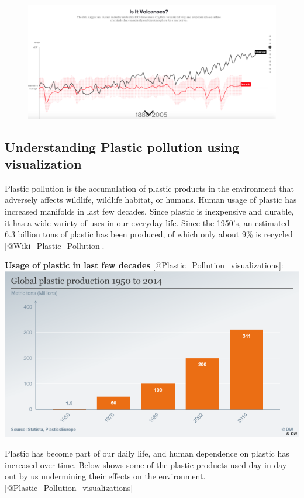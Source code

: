 \documentclass[]{book}
\theoremstyle{definition}
\theoremstyle{definition}
\theoremstyle{definition}
\theoremstyle{remark}
\begin{document}
\begin{figure}
\centering
\includegraphics{images/volcano_global_warming.png}
\caption{}
\end{figure}

\subsection{Understanding Plastic pollution using
visualization}\label{understanding-plastic-pollution-using-visualization}

Plastic pollution is the accumulation of plastic products in the
environment that adversely affects wildlife, wildlife habitat, or
humans. Human usage of plastic has increased manifolds in last few
decades. Since plastic is inexpensive and durable, it has a wide variety
of uses in our everyday life. Since the 1950's, an estimated 6.3 billion
tons of plastic has been produced, of which only about 9\% is recycled
{[}@Wiki\_Plastic\_Pollution{]}.

\textbf{Usage of plastic in last few decades}
{[}@Plastic\_Pollution\_visualizations{]}:
\includegraphics{images/global_plastic_usage.png}

Plastic has become part of our daily life, and human dependence on
plastic has increased over time. Below shows some of the plastic
products used day in day out by us undermining their effects on the
environment. {[}@Plastic\_Pollution\_visualizations{]}
\end{document}
